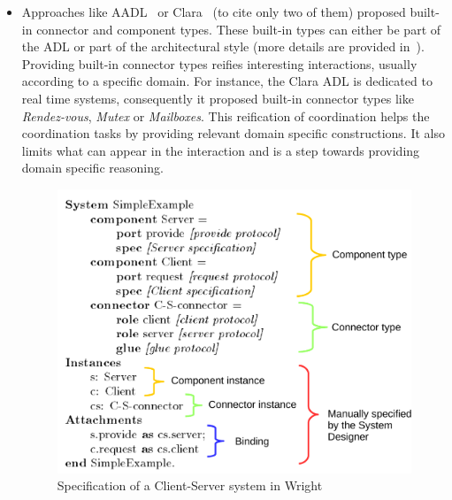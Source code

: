 \begin{itemize}
			\item Approaches like AADL~\cite{aadlbib} or Clara~\cite{clarabib} (to cite only two of them) proposed built-in connector and component types. These built-in types can either be part of the ADL or part of the architectural style (more details are provided in~\cite{taxonomyConnectors}). Providing built-in connector types reifies interesting interactions, usually according to a specific domain. For instance, the Clara ADL is dedicated to real time systems, consequently it proposed built-in connector types like \emph{Rendez-vous}, \emph{Mutex} or \emph{Mailboxes}. This reification of coordination helps the coordination tasks by providing relevant domain specific constructions. It also limits what can appear in the interaction and is a step towards providing domain specific reasoning.
			
			
			\begin{figure}
				\begin{center}
					\includegraphics[width=0.5\columnwidth]{background/figs/wrightspec}
					\caption{Specification of a Client-Server system in Wright~\cite{wrightbib}}
					\label{fig:wrightspec}
				\end{center}
			\end{figure}
			

\end{itemize}
